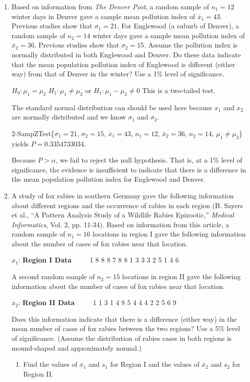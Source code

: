 \begin{enumerate}

\item Based on information from {\em The Denver Post}, a random sample of $n_1 = 12$ winter days in Denver gave a sample mean pollution index of $\bar{x}_1= 43$.  Previous studies show that $\sigma_1 = 21$. For Englewood (a suburb of Denver), a random sample of $n_2=14$ winter days gave a sample mean pollution index of $\bar{x}_2 = 36$.  Previous studies show that $\sigma_2 = 15$.  Assume the pollution index is normally distributed in both Englewood and Denver.  Do these data indicate that the mean population pollution index of Englewood is different (either way) from that of Denver in the winter?  Use a 1\% level of significance.  
	
{\answer 
$H_0: \mu_1 = \mu_2$  
$H_1: \mu_1 \neq \mu_2$  or $H_1: \mu_1 - \mu_2 \neq 0$ 
This is a two-tailed test.  
	
The standard normal distribution can should be used here because $x_1$ and $x_2$ are normally distributed and we know $\sigma_1$ and $\sigma_2$.  

2-SampZTest\{$\sigma_1 = 21$, $\sigma_2 = 15$, $\bar{x}_1 = 43$, $n_1 = 12$, $\bar{x}_2 = 36$, $n_2 = 14$, $\mu_1 \neq \mu_2$\} yields $P = 0.3354733034$.  

Because $P > \alpha$, we fail to reject the null hypothesis. That is, at a 1\% level of significance, the evidence is insufficient to indicate that there is a difference in the mean population pollution index for Englewood and Denver.  
} 
\vfill 

\newpage

\item A study of fox rabies in southern Germany gave the following information about different regions and the occurrence of rabies in each region (B. Sayers et al., ``A Pattern Analysis Study of a Wildlife Rabies Epizootic,'' {\it Medical Informatics}, Vol. 2, pp. 11-34). Based on information from this article, a random sample of $n_1=16$ locations in region I gave the following information about the number of cases of fox rabies near that location.
\begin{center} $x_1$: {\bf Region I Data} $\qquad$ 1 8 8 8 7 8 8 1 3 3 3 2 5 1 4 6 \end{center}
A second random sample of $n_2=15$ locations in region II gave the following information about the number of cases of fox rabies near that location.
\begin{center}$x_2$: {\bf Region II Data} $\qquad$ 1 1 3 1 4 8 5 4 4 4 2 2 5 6 9 \end{center}
Does this information indicate that there is a difference (either way) in the mean number of cases of fox rabies between the two regions? Use a 5\% level of significance. (Assume the distribution of rabies cases in both regions is mound-shaped and approximately normal.)
	\begin{enumerate}
	\item Find the values of $\overline{x}_1$ and $s_1$ for Region I and the values of $\overline{x}_2$ and $s_2$ for Region II.  
	

\end{enumerate}
\end{enumerate}
